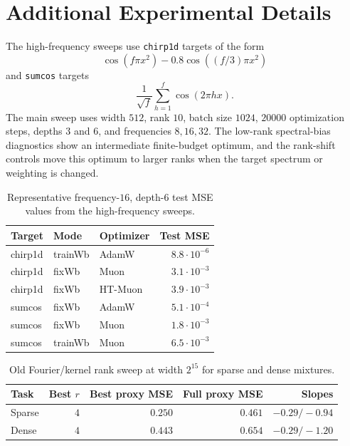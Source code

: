 \documentclass{article}
\begin{document}
\section{Additional Experimental Details}
\label{app:exp-details}

The high-frequency sweeps use \texttt{chirp1d} targets of the form
\begin{equation}
\cos(f\pi x^2)-0.8\cos((f/3)\pi x^2)
\end{equation}
and \texttt{sumcos} targets
\begin{equation}
\frac{1}{\sqrt f}\sum_{h=1}^{f}\cos(2\pi h x).
\end{equation}
The main sweep uses width $512$, rank $10$, batch size $1024$, $20000$ optimization steps, depths $3$ and $6$, and frequencies $8,16,32$. The low-rank spectral-bias diagnostics show an intermediate finite-budget optimum, and the rank-shift controls move this optimum to larger ranks when the target spectrum or weighting is changed.

\begin{table}[h]
\centering
\caption{Representative frequency-$16$, depth-$6$ test MSE values from the high-frequency sweeps.}
\label{tab:freq16}
\begin{tabular}{lllr}
\toprule
Target & Mode & Optimizer & Test MSE \\
\midrule
chirp1d & trainWb & AdamW & $8.8\cdot10^{-6}$ \\
chirp1d & fixWb & Muon & $3.1\cdot10^{-3}$ \\
chirp1d & fixWb & HT-Muon & $3.9\cdot10^{-3}$ \\
sumcos & fixWb & AdamW & $5.1\cdot10^{-4}$ \\
sumcos & fixWb & Muon & $1.8\cdot10^{-3}$ \\
sumcos & trainWb & Muon & $6.5\cdot10^{-3}$ \\
\bottomrule
\end{tabular}
\end{table}

\begin{table}[h]
\centering
\caption{Old Fourier/kernel rank sweep at width $2^{15}$ for sparse and dense mixtures.}
\label{tab:fourier-rank}
\begin{tabular}{lrrrr}
\toprule
Task & Best $r$ & Best proxy MSE & Full proxy MSE & Slopes \\
\midrule
Sparse & $4$ & $0.250$ & $0.461$ & $-0.29/-0.94$ \\
Dense & $4$ & $0.443$ & $0.654$ & $-0.29/-1.20$ \\
\bottomrule
\end{tabular}
\end{table}
\end{document}
